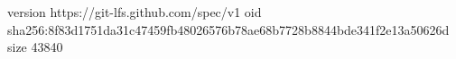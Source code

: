 version https://git-lfs.github.com/spec/v1
oid sha256:8f83d1751da31c47459fb48026576b78ae68b7728b8844bde341f2e13a50626d
size 43840
